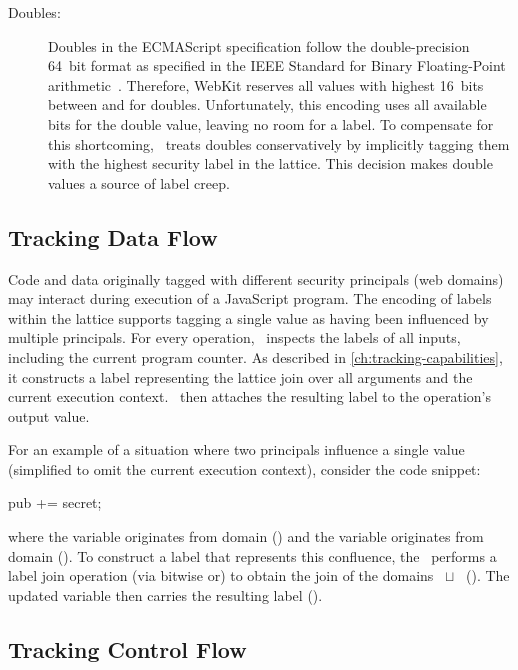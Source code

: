 \begin{description}
\item[Doubles:]
Doubles in the ECMAScript specification follow the double-precision 64~bit format as specified in the IEEE Standard for Binary Floating-Point arithmetic~\cite{ieee754}.
Therefore, WebKit reserves all values with highest 16~bits between  and  for doubles.
Unfortunately, this encoding uses all available bits for the double value, leaving no room for a label.
To compensate for this shortcoming, \JitFlow\ treats doubles conservatively by implicitly tagging them with the highest security label in the lattice.
This decision makes double values a source of label creep.

\end{description}

\subsection{Tracking Data Flow}
\label{sec:jitflow-tracking-dataflow}

Code and data originally tagged with different security principals (web domains) may interact during execution of a JavaScript program.
The encoding of labels within the lattice supports tagging a single value as having been influenced by multiple principals.
For every operation, \JitFlow\ inspects the labels of all inputs, including the current program counter.
As described in \autoref{ch:tracking-capabilities}, it constructs a label representing the lattice join over all arguments and the current execution context.
\JitFlow\ then attaches the resulting label to the operation's output value.

For an example of a situation where two principals influence a single value (simplified to omit the current execution context), consider the code snippet:

\begin{snippet}
pub += secret;
\end{snippet}

where the variable  originates from domain  () and the variable  originates from domain  ().
To construct a label that represents this confluence, the \JitFlow\ performs a label join operation (via bitwise or) to obtain the join of the domains ~$\sqcup$~ ().
The updated variable  then carries the resulting label ().


\subsection{Tracking Control Flow}
\label{sec:jitflow-tracking-controlflow}

